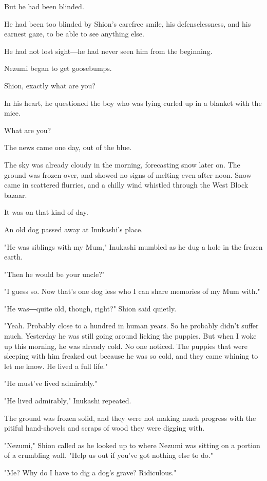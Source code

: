 But he had been blinded.

He had been too blinded by Shion's carefree smile, his defenselessness,
and his earnest gaze, to be able to see anything else.

He had not lost sight―he had never seen him from the beginning.

Nezumi began to get goosebumps.

Shion, exactly what are you?

In his heart, he questioned the boy who was lying curled up in a blanket
with the mice.

What are you?

The news came one day, out of the blue.

The sky was already cloudy in the morning, forecasting snow later on.
The ground was frozen over, and showed no signs of melting even after
noon. Snow came in scattered flurries, and a chilly wind whistled
through the West Block bazaar.

It was on that kind of day.

An old dog passed away at Inukashi's place.

"He was siblings with my Mum," Inukashi mumbled as he dug a hole in the
frozen earth.

"Then he would be your uncle?"

"I guess so. Now that's one dog less who I can share memories of my Mum
with."

"He was―quite old, though, right?" Shion said quietly.

"Yeah. Probably close to a hundred in human years. So he probably didn't
suffer much. Yesterday he was still going around licking the puppies.
But when I woke up this morning, he was already cold. No one noticed.
The puppies that were sleeping with him freaked out because he was so
cold, and they came whining to let me know. He lived a full life."

"He must've lived admirably."

"He lived admirably," Inukashi repeated.

The ground was frozen solid, and they were not making much progress with
the pitiful hand-shovels and scraps of wood they were digging with.

"Nezumi," Shion called as he looked up to where Nezumi was sitting on a
portion of a crumbling wall. "Help us out if you've got nothing else to
do."

"Me? Why do I have to dig a dog's grave? Ridiculous."

